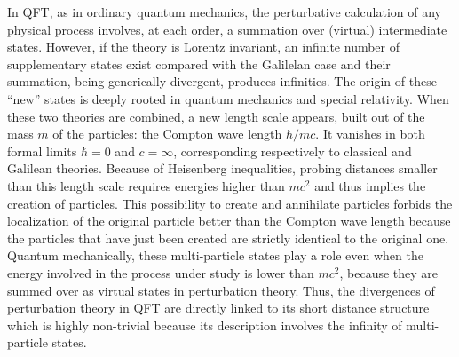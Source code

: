 \documentclass[floatfix,preprintnumbers,amsmath,amssymb,prb,12pt]{revtex4-1}
\begin{document}
In QFT, as in ordinary quantum mechanics, 
the perturbative calculation of any physical process involves, at
each order, a summation over (virtual) intermediate states.
However, if the theory is Lorentz invariant, an infinite number
of supplementary states exist compared with the Galilelan case
and their summation, being generically divergent,
produces infinities. The origin of these
``new'' states is deeply rooted in quantum mechanics and 
special relativity. When these two theories are combined, a new
length scale appears, built out of the mass $m$ of the particles:
the Compton wave length
$\hbar/mc$. It vanishes in both formal limits
$\hbar=0$ and $c=\infty$, corresponding respectively to classical
and Galilean theories. Because of Heisenberg inequalities,
probing distances smaller than this length scale requires energies
higher than $m c^2$ and thus implies the creation of particles.
This possibility to create and annihilate particles forbids the
localization of the original particle better than the Compton wave
length because the particles that have just been created are
strictly identical to the original one. Quantum mechanically,
these multi-particle states play a role even when the energy
involved in the process under study is lower than $m c^2$, because
they are summed over as virtual states in perturbation theory.
Thus, the divergences of perturbation theory in QFT are directly
linked to its short distance structure which is highly non-trivial
because its description involves the infinity of multi-particle
states.
\end{document}

